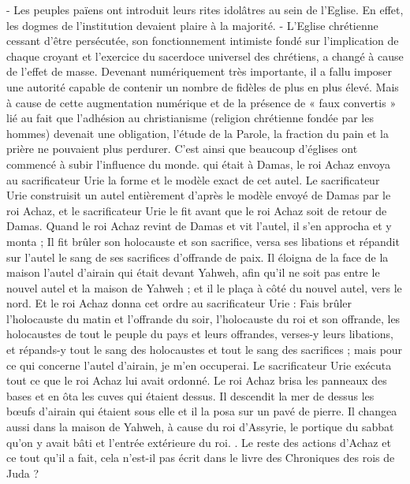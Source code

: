 \begin{multicols}{2}
{- Les peuples païens ont introduit leurs rites idolâtres au sein de l'Eglise. En effet, les dogmes de l'institution devaient plaire à la majorité.
- L'Eglise chrétienne cessant d'être persécutée, son fonctionnement intimiste fondé sur l'implication de chaque croyant et l'exercice du sacerdoce universel des chrétiens, a changé à cause de l'effet de masse. Devenant numériquement très importante, il a fallu imposer une autorité capable de contenir un nombre de fidèles de plus en plus élevé. Mais à cause de cette augmentation numérique et de la présence de « faux convertis » lié au fait que l'adhésion au christianisme (religion chrétienne fondée par les hommes) devenait une obligation, l'étude de la Parole, la fraction du pain et la prière ne pouvaient plus perdurer. C'est ainsi que beaucoup d'églises ont commencé à subir l'influence du monde.} qui était à Damas, le roi Achaz envoya au sacrificateur Urie la forme et le modèle exact de cet autel.
Le sacrificateur Urie construisit un autel entièrement d'après le modèle envoyé de Damas par le roi Achaz, et le sacrificateur Urie le fit avant que le roi Achaz soit de retour de Damas.
Quand le roi Achaz revint de Damas et vit l'autel, il s'en approcha et y monta ;
Il fit brûler son holocauste et son sacrifice, versa ses libations et répandit sur l'autel le sang de ses sacrifices d'offrande de paix.
Il éloigna de la face de la maison l'autel d'airain qui était devant Yahweh, afin qu'il ne soit pas entre le nouvel autel et la maison de Yahweh ; et il le plaça à côté du nouvel autel, vers le nord.
Et le roi Achaz donna cet ordre au sacrificateur Urie : Fais brûler l'holocauste du matin et l'offrande du soir, l'holocauste du roi et son offrande, les holocaustes de tout le peuple du pays et leurs offrandes, verses-y leurs libations, et répands-y tout le sang des holocaustes et tout le sang des sacrifices ; mais pour ce qui concerne l'autel d'airain, je m'en occuperai.
Le sacrificateur Urie exécuta tout ce que le roi Achaz lui avait ordonné.
Le roi Achaz brisa les panneaux des bases et en ôta les cuves qui étaient dessus. Il descendit la mer de dessus les bœufs d'airain qui étaient sous elle et il la posa sur un pavé de pierre.
Il changea aussi dans la maison de Yahweh, à cause du roi d'Assyrie, le portique du sabbat qu'on y avait bâti et l'entrée extérieure du roi.
.
Le reste des actions d'Achaz et ce tout qu'il a fait, cela n'est-il pas écrit dans le livre des Chroniques des rois de Juda ?

\end{multicols}
